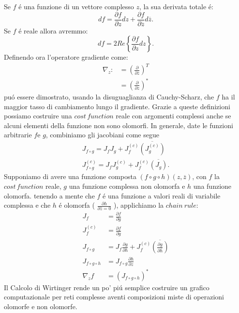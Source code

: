 \documentclass[a4paper,10pt]{article}
\begin{document}
 Se $f$ \'e una funzione di un vettore complesso $z$, la sua derivata totale \'e:
 \begin{equation}
  df=\frac{\partial f}{\partial z}dz+\frac{\partial f}{\partial \overline{z}}d\overline{z}.
 \end{equation}
 Se $f$ \'e reale allora avremmo:
 \begin{equation}
  df=2Re\left \{ \frac{\partial f}{\partial z} dz \right \}.
 \end{equation}
 Definendo ora l'operatore gradiente come:
 \begin{align}
  \nabla_z :&= \left(\frac{\partial}{\partial\overline{z}}\right)^T\\
  &=\left(\frac{\partial}{\partial z}\right)^*
 \end{align}
 pu\'o essere dimostrato, usando la disuguaglianza di Cauchy-Scharz, che $f$ ha il maggior tasso di cambiamento lungo il gradiente. Grazie a queste definizioni possiamo costruire una $cost \, function$ reale con argomenti complessi anche se alcuni elementi della funzione non sono olomorfi. In generale, date le funzioni arbitrarie $f$e $g$, combiniamo gli jacobiani come segue
 \begin{align}
  J_{f\circ g} = J_f J_g + J_f^{\left(c\right)}\overline{\left(J_g^{\left(c\right)}\right)}\\
  J_{f\circ g}^{\left(c\right)} = J_f J_g^{\left(c\right)} + J_f^{\left(c\right)}\overline{\left(J_g\right)}.
 \end{align}
 Supponiamo di avere una funzione composta $\left(f\circ g\circ h\right)\left(z,\overline{z}\right)$, con $f$ la $cost \, function$ reale, $g$ una funzione complessa non olomorfa e $h$ una funzione olomorfa. tenendo a mente che $f$ \'e una funzione a valori reali di variabile complessa e che $h$ \'e olomorfa ( $\frac{\partial h}{\partial \overline{z} = 0}$ ), applichiamo la $chain \ rule$:
 \begin{align}
  J_f &= \frac{ \partial f}{ \partial g}\\
  J_f^{\left( c\right)} &= \frac{\partial f}{\partial \overline{g}}\\
  J_{f\circ g} &= J_f \frac{\partial g}{\partial h} + J_f^{\left( c\right)} \overline{\left( \frac{\partial g}{\partial \overline{h}}\right) }\\
  J_{f\circ g\circ h} &= J_{f\circ g} \frac{\partial h}{\partial z}\\
  \nabla_z f &= \left( J_{f\circ g\circ h}\right)^*
 \end{align}
 Il Calcolo di Wirtinger rende un po' pi\'u semplice costruire un grafico computazionale per reti complesse aventi composizioni miste di operazioni olomorfe e non olomorfe.
 
\end{document}
